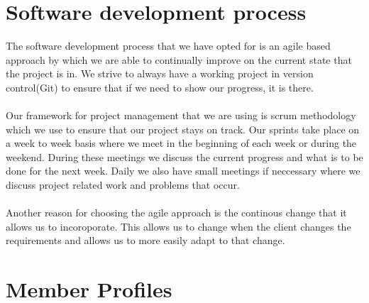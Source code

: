 \documentclass[a4paper,12pt,final]{article}
\begin{document}
\section{Software development process}
The software development process that we have opted for is an
agile based approach by which we are able to continually improve 
on the current state that the project is in. We strive to always have
a working project in version control(Git) to ensure that if we need to
show our progress, it is there.\\
\textbf{\\}
Our framework for project management that we are using is scrum methodology 
which we use to ensure that our project stays on track. Our sprints take
place on a week to week basis where we meet in the beginning of each week
or during the weekend. During these meetings we discuss the current
progress and what is to be done for the next week. Daily we
also have small meetings if neccessary where we discuss project related work and problems that occur.\\
\textbf{\\}
Another reason for choosing the agile approach is the continous change that it
allows us to incoroporate. This allows us to change when the client changes the
requirements and allows us to more easily adapt to that change.

\newpage
\section{Member Profiles}
\end{document}
